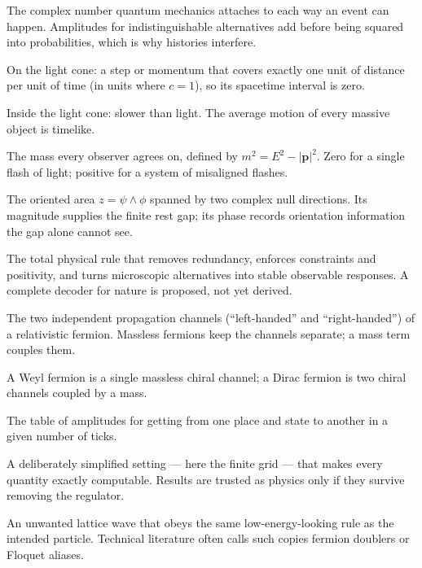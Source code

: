 \documentclass[11pt]{article}
\begin{document}
\begin{description}[itemsep=0.15em,leftmargin=1.35em]
  \item[Amplitude.]  The complex number quantum mechanics attaches to each way
  an event can happen.  Amplitudes for indistinguishable alternatives add
  before being squared into probabilities, which is why histories interfere.
  \item[Null / lightlike.]  On the light cone: a step or momentum that covers
  exactly one unit of distance per unit of time (in units where $c=1$), so its
  spacetime interval is zero.
  \item[Timelike.]  Inside the light cone: slower than light.  The average
  motion of every massive object is timelike.
  \item[Invariant mass.]  The mass every observer agrees on, defined by
  $m^2=E^2-|\mathbf p|^2$.  Zero for a single flash of light; positive for a
  system of misaligned flashes.
  \item[Pluecker area.]  The oriented area $z=\psi\wedge\phi$ spanned by two
  complex null directions.  Its magnitude supplies the finite rest gap; its
  phase records orientation information the gap alone cannot see.
  \item[Decoder.]  The total physical rule that removes redundancy, enforces
  constraints and positivity, and turns microscopic alternatives into stable
  observable responses.  A complete decoder for nature is proposed, not yet
  derived.
  \item[Chirality.]  The two independent propagation channels
  (``left-handed'' and ``right-handed'') of a relativistic fermion.  Massless
  fermions keep the channels separate; a mass term couples them.
  \item[Weyl / Dirac fermion.]  A Weyl fermion is a single massless chiral
  channel; a Dirac fermion is two chiral channels coupled by a mass.
  \item[Propagator.]  The table of amplitudes for getting from one place and
  state to another in a given number of ticks.
  \item[Regulator.]  A deliberately simplified setting --- here the finite
  grid --- that makes every quantity exactly computable.  Results are trusted
  as physics only if they survive removing the regulator.
  \item[High-frequency copy.]  An unwanted lattice wave that obeys the same
  low-energy-looking rule as the intended particle.  Technical literature
  often calls such copies fermion doublers or Floquet aliases.

\end{description}
\end{document}
